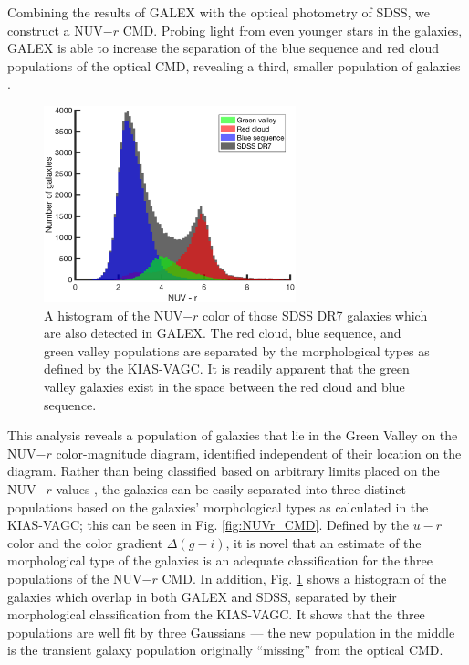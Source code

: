 Combining the results of GALEX with the optical photometry of SDSS, we construct 
a NUV$-r$ CMD.  Probing light from even younger stars in the galaxies, GALEX is 
able to increase the separation of the blue sequence and red cloud populations 
of the optical CMD, revealing a third, smaller population of galaxies 
\citep{Wyder07}.

\begin{figure}
    \includegraphics[width=0.65\textwidth]{Images/GV/NUVr_CMDclassifications}
    \caption[Distribution of NUV-$r$ of SDSS galaxies]{A histogram of the 
    NUV$-r$ color of those SDSS DR7 galaxies which are also detected in GALEX.  
    The red cloud, blue sequence, and green valley populations are separated by 
    the morphological types as defined by the KIAS-VAGC.  It is readily apparent 
    that the green valley galaxies exist in the space between the red cloud and 
    blue sequence.}
    \label{fig:NUVr_hist}
\end{figure}

This analysis reveals a population of galaxies that lie in the Green Valley on 
the NUV$-r$ color-magnitude diagram, identified independent of their location on 
the diagram.  Rather than being classified based on arbitrary limits placed on 
the NUV$-r$ values \citep[as done by][]{Schawinski14,Salim14a}, the galaxies can 
be easily separated into three distinct populations based on the galaxies' 
morphological types as calculated in the KIAS-VAGC; this can be seen in Fig. 
\ref{fig:NUVr_CMD}.  Defined by the $u-r$ color and the color gradient 
$\Delta (g-i)$, it is novel that an estimate of the morphological type of the 
galaxies is an adequate classification for the three populations of the NUV$-r$ 
CMD.  In addition, Fig. \ref{fig:NUVr_hist} shows a histogram of the galaxies 
which overlap in both GALEX and SDSS, separated by their morphological 
classification from the KIAS-VAGC.  It shows that the three populations are well 
fit by three Gaussians --- the new population in the middle is the transient 
galaxy population originally ``missing'' from the optical CMD.

